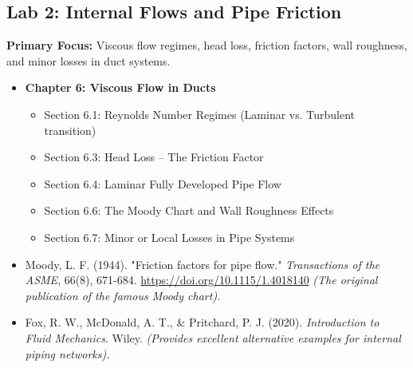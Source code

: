 \documentclass[12pt,letterpaper]{article}
\begin{document}
\subsection*{Lab 2: Internal Flows and Pipe Friction}
\textbf{Primary Focus:} Viscous flow regimes, head loss, friction factors, wall roughness, and minor losses in duct systems.
\begin{itemize}
    \item \textbf{Chapter 6: Viscous Flow in Ducts}
    \begin{itemize}
        \item Section 6.1: Reynolds Number Regimes (Laminar vs. Turbulent transition)
        \item Section 6.3: Head Loss -- The Friction Factor
        \item Section 6.4: Laminar Fully Developed Pipe Flow
        \item Section 6.6: The Moody Chart and Wall Roughness Effects
        \item Section 6.7: Minor or Local Losses in Pipe Systems
    \end{itemize}
    \end{itemize}
\begin{itemize}
        \item Moody, L. F. (1944). "Friction factors for pipe flow." \textit{Transactions of the ASME}, 66(8), 671-684. \url{https://doi.org/10.1115/1.4018140} \textit{(The original publication of the famous Moody chart).}
        \item Fox, R. W., McDonald, A. T., \& Pritchard, P. J. (2020). \textit{Introduction to Fluid Mechanics}. Wiley. \textit{(Provides excellent alternative examples for internal piping networks).}
    \end{itemize}
    
\end{document}
